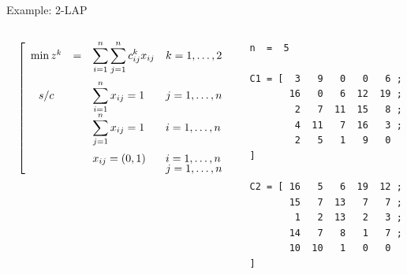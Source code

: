 \documentclass[10pt,xcolor=dvipsnames]{beamer}
\begin{document}
\begin{frame}[fragile=singleslide]{Example: 2-LAP }

\begin{columns}
%
\begin{column}{0.6\textwidth}
{\footnotesize
\hspace{0mm}
$
\quad
\left [
\begin{array}{cllllll}

  \min z^k&  =  & \displaystyle{\sum_{i=1}^{n}\sum_{j=1}^{n} c^k_{ij} x_{ij}}  &  k=1,\dots,2\vspace{2mm} \\

  s/c &\  &   \displaystyle{\sum_{i=1}^{n}  x_{ij}}   =  1 &   j=1,\dots ,n \  \ \  \\
        &  &   \displaystyle{\sum_{j=1}^{n}  x_{ij}}   =  1 &  i=1,\dots ,n \    \vspace{2mm} \\

&  &   x_{ij} = (0,1) &   i=1,\dots ,n  \vspace{-1mm}\\
&  &    &  j=1,\dots ,n\\ 
 
\end{array}
\right ]
$
}
\end{column}
%
\begin{column}{0.425\textwidth}
{\scriptsize
\begin{verbatim}
n  =  5

C1 = [  3   9   0   0   6 ;
       16   0   6  12  19 ;
        2   7  11  15   8 ;
        4  11   7  16   3 ;
        2   5   1   9   0   ]

C2 = [ 16   5   6  19  12 ;
       15   7  13   7   7 ;
        1   2  13   2   3 ;
       14   7   8   1   7 ;
       10  10   1   0   0   ]
\end{verbatim}
}
\end{column}
%
\end{columns}
\end{frame}
\end{document}
